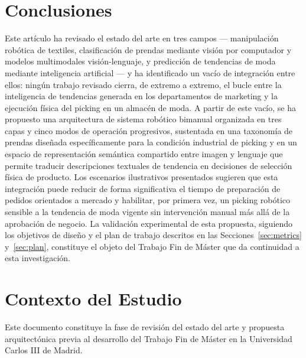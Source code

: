 \documentclass[conference]{IEEEtran}
\begin{document}
\section{Conclusiones}
\label{sec:conclusion}

Este artículo ha revisado el estado del arte en tres campos --- manipulación
robótica de textiles, clasificación de prendas mediante visión por
computador y modelos multimodales visión-lenguaje, y predicción de
tendencias de moda mediante inteligencia artificial --- y ha identificado un
vacío de integración entre ellos: ningún trabajo revisado cierra, de
extremo a extremo, el bucle entre la inteligencia de tendencias generada en
los departamentos de marketing y la ejecución física del picking en un
almacén de moda. A partir de este vacío, se ha propuesto una arquitectura de
sistema robótico bimanual organizada en tres capas y cinco modos de
operación progresivos, sustentada en una taxonomía de prendas diseñada
específicamente para la condición industrial de picking y en un espacio de
representación semántica compartido entre imagen y lenguaje que permite
traducir descripciones textuales de tendencia en decisiones de selección
física de producto. Los escenarios ilustrativos presentados sugieren que
esta integración puede reducir de forma significativa el tiempo de
preparación de pedidos orientados a mercado y habilitar, por primera vez, un
picking robótico sensible a la tendencia de moda vigente sin intervención
manual más allá de la aprobación de negocio. La validación experimental de
esta propuesta, siguiendo los objetivos de diseño y el plan de trabajo
descritos en las Secciones~\ref{sec:metrics} y~\ref{sec:plan}, constituye el
objeto del Trabajo Fin de Máster que da continuidad a esta investigación.

\section*{Contexto del Estudio}
Este documento constituye la fase de revisión del estado del arte y propuesta arquitectónica previa al desarrollo del Trabajo Fin de Máster en la Universidad Carlos III de Madrid.
\end{document}
